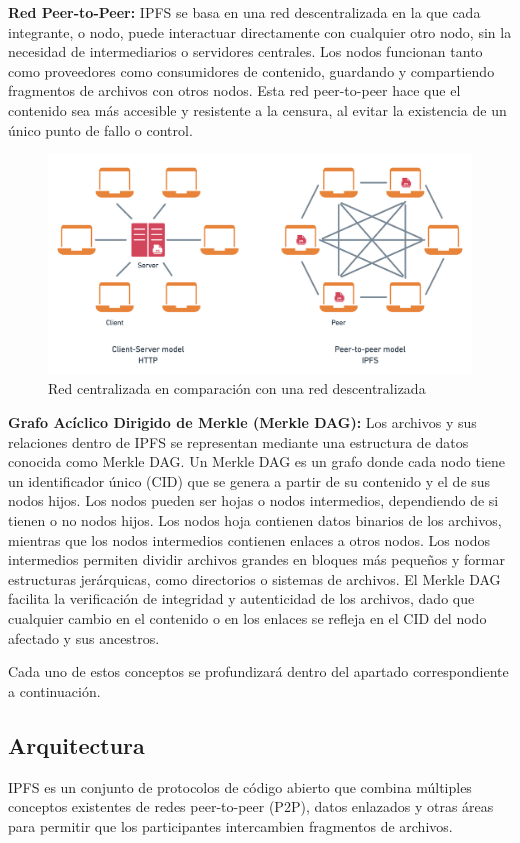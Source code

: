 \textbf{Red Peer-to-Peer:} IPFS se basa en una red descentralizada en la que cada integrante, o nodo, puede interactuar directamente con cualquier otro nodo, sin la necesidad de intermediarios o servidores centrales. Los nodos funcionan tanto como proveedores como consumidores de contenido, guardando y compartiendo fragmentos de archivos con otros nodos. Esta red peer-to-peer hace que el contenido sea más accesible y resistente a la censura, al evitar la existencia de un único punto de fallo o control.
\begin{figure}[H]
      \centering
      \includegraphics[width=\linewidth]{images/centralvsdecentral.png}
      \caption{Red centralizada en comparación con una red descentralizada}
      \label{fig:centralvsdecentral}
\end{figure}

\textbf{Grafo Acíclico Dirigido de Merkle (Merkle DAG):} Los archivos y sus relaciones dentro de IPFS se representan mediante una estructura de datos conocida como Merkle DAG. Un Merkle DAG es un grafo donde cada nodo tiene un identificador único (CID) que se genera a partir de su contenido y el de sus nodos hijos. Los nodos pueden ser hojas o nodos intermedios, dependiendo de si tienen o no nodos hijos. Los nodos hoja contienen datos binarios de los archivos, mientras que los nodos intermedios contienen enlaces a otros nodos. Los nodos intermedios permiten dividir archivos grandes en bloques más pequeños y formar estructuras jerárquicas, como directorios o sistemas de archivos. El Merkle DAG facilita la verificación de integridad y autenticidad de los archivos, dado que cualquier cambio en el contenido o en los enlaces se refleja en el CID del nodo afectado y sus ancestros.

Cada uno de estos conceptos se profundizará dentro del apartado correspondiente a continuación.

\subsection{Arquitectura}
IPFS es un conjunto de protocolos de código abierto que combina múltiples conceptos existentes de redes
peer-to-peer (P2P), datos enlazados y otras áreas para permitir que los participantes intercambien fragmentos de
archivos.

